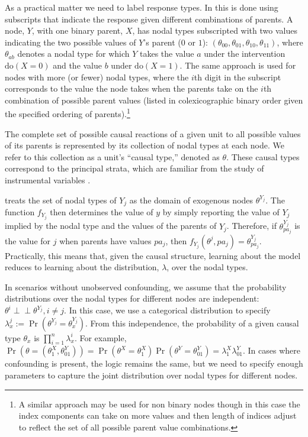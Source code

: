 \documentclass[
  11pt,
  article]{jss}
\begin{document}
As a practical matter we need to label response types. In
 this is done using subscripts that indicate the
response given different combinations of parents. A node, \(Y\), with
one binary parent, \(X\), has nodal types subscripted with two values
indicating the two possible values of \(Y\)'s parent (\(0\) or \(1\)):
\((\theta_{00}, \theta_{01}, \theta_{10}, \theta_{11})\), where
\(\theta_{ab}\) denotes a nodal type for which \(Y\) takes the value
\(a\) under the intervention \(\text{do}(X = 0)\) and the value \(b\)
under \(\text{do}(X = 1)\). The same approach is used for nodes with
more (or fewer) nodal types, where the \(i\)th digit in the subscript
corresponds to the value the node takes when the parents take on the
\(i\)th combination of possible parent values (listed in colexicographic
binary order given the specified ordering of parents).\footnote{A
  similar approach may be used for non binary nodes though in this case
  the index components can take on more values and then length of
  indices adjust to reflect the set of all possible parent value
  combinations.}

The complete set of possible causal reactions of a given unit to all
possible values of its parents is represented by its collection of nodal
types at each node. We refer to this collection as a unit's ``causal
type,'' denoted as \(\theta\). These causal types correspond to the
principal strata, which are familiar from the study of instrumental
variables \citep{frangakis_principal_2002}.

 treats the set of nodal types of \(Y_j\) as the
domain of exogenous nodes \(\theta^{Y_j}\). The function \(f_{Y_j}\)
then determines the value of \(y\) by simply reporting the value of
\(Y_j\) implied by the nodal type and the values of the parents of
\(Y_j\). Therefore, if \(\theta^{Y_j}_{pa_j}\) is the value for \(j\)
when parents have values \(pa_j\), then
\(f_{Y_j}(\theta^{j}, pa_j) = \theta^{Y_j}_{pa_j}\). Practically, this
means that, given the causal structure, learning about the model reduces
to learning about the distribution, \(\lambda\), over the nodal types.

In scenarios without unobserved confounding, we assume that the
probability distributions over the nodal types for different nodes are
independent: \(\theta^i \perp\!\!\! \perp \theta^{Y_j}, i\neq j\). In
this case, we use a categorical distribution to specify
\({\lambda^j_x} := \Pr(\theta^{Y_j} = {\theta^{Y_j}_x})\). From this
independence, the probability of a given causal type \(\theta_x\) is
\(\prod_{i=1}^n {\lambda^i_x}\). For example,
\(\Pr(\theta = (\theta^X_1, \theta^Y_{01})) = \Pr(\theta^X = \theta^X_1)\Pr(\theta^Y = \theta^Y_{01}) = \lambda^X_1\lambda^Y_{01}\).
In cases where confounding is present, the logic remains the same, but
we need to specify enough parameters to capture the joint distribution
over nodal types for different nodes.
\end{document}
